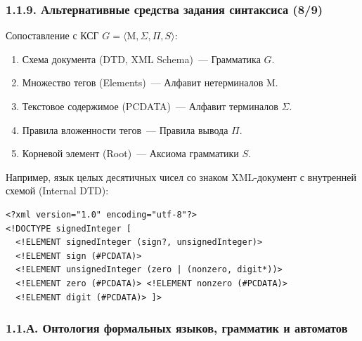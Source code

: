 \begin{frame}[fragile]
\frametitle{1.1.9. Альтернативные средства задания синтаксиса (8/9)}
    \smallskip
\begin{example}
Сопоставление с КСГ $G=\langle \mathrm{M}, \Sigma, \Pi, S\rangle$:
\begin{enumerate}
    \item Схема документа (DTD, XML Schema)~--- Грамматика $G$.
    \item Множество тегов (Elements)~--- Алфавит нетерминалов $\mathrm{M}$.
    \item Текстовое содержимое (PCDATA)~--- Алфавит терминалов $\Sigma$.
    \item Правила вложенности тегов~--- Правила вывода $\Pi$.
    \item Корневой элемент (Root)~--- Аксиома грамматики $S$.
\end{enumerate}
 Например, язык целых десятичных чисел со знаком XML-документ с внутренней схемой (Internal DTD):
\scriptsize %
\begin{verbatim}
<?xml version="1.0" encoding="utf-8"?>
<!DOCTYPE signedInteger [
  <!ELEMENT signedInteger (sign?, unsignedInteger)>
  <!ELEMENT sign (#PCDATA)>
  <!ELEMENT unsignedInteger (zero | (nonzero, digit*))>
  <!ELEMENT zero (#PCDATA)> <!ELEMENT nonzero (#PCDATA)> 
  <!ELEMENT digit (#PCDATA)> ]>
\end{verbatim}
\end{example}

\end{frame}





\begin{frame}
\frametitle{1.1.А. Онтология формальных языков, грамматик и автоматов}
\end{frame}

